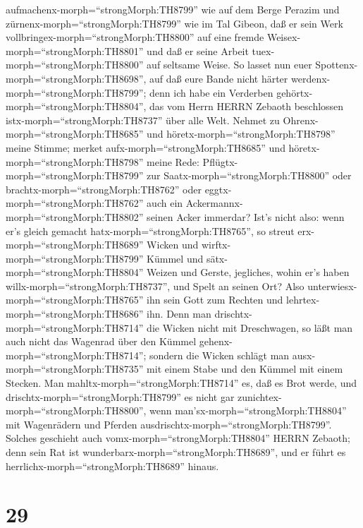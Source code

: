 aufmachenx-morph=``strongMorph:TH8799'' wie auf dem Berge Perazim und
zürnenx-morph=``strongMorph:TH8799'' wie im Tal Gibeon, daß er sein Werk
vollbringex-morph=``strongMorph:TH8800'' auf eine fremde
Weisex-morph=``strongMorph:TH8801'' und daß er seine Arbeit
tuex-morph=``strongMorph:TH8800'' auf seltsame Weise.  So
lasset nun euer Spottenx-morph=``strongMorph:TH8698'', auf daß eure
Bande nicht härter werdenx-morph=``strongMorph:TH8799''; denn ich habe
ein Verderben gehörtx-morph=``strongMorph:TH8804'', das vom Herrn HERRN
Zebaoth beschlossen istx-morph=``strongMorph:TH8737'' über alle Welt.
 Nehmet zu Ohrenx-morph=``strongMorph:TH8685'' und
höretx-morph=``strongMorph:TH8798'' meine Stimme; merket
aufx-morph=``strongMorph:TH8685'' und
höretx-morph=``strongMorph:TH8798'' meine Rede: 
Pflügtx-morph=``strongMorph:TH8799'' zur
Saatx-morph=``strongMorph:TH8800'' oder
brachtx-morph=``strongMorph:TH8762'' oder
eggtx-morph=``strongMorph:TH8762'' auch ein
Ackermannx-morph=``strongMorph:TH8802'' seinen Acker immerdar?
 Ist's nicht also: wenn er's gleich gemacht
hatx-morph=``strongMorph:TH8765'', so streut
erx-morph=``strongMorph:TH8689'' Wicken und
wirftx-morph=``strongMorph:TH8799'' Kümmel und
sätx-morph=``strongMorph:TH8804'' Weizen und Gerste, jegliches, wohin
er's haben willx-morph=``strongMorph:TH8737'', und Spelt an seinen Ort?
 Also unterwiesx-morph=``strongMorph:TH8765'' ihn sein Gott
zum Rechten und lehrtex-morph=``strongMorph:TH8686'' ihn. 
Denn man drischtx-morph=``strongMorph:TH8714'' die Wicken nicht mit
Dreschwagen, so läßt man auch nicht das Wagenrad über den Kümmel
gehenx-morph=``strongMorph:TH8714''; sondern die Wicken schlägt man
ausx-morph=``strongMorph:TH8735'' mit einem Stabe und den Kümmel mit
einem Stecken.  Man mahltx-morph=``strongMorph:TH8714'' es,
daß es Brot werde, und drischtx-morph=``strongMorph:TH8799'' es nicht
gar zunichtex-morph=``strongMorph:TH8800'', wenn
man'sx-morph=``strongMorph:TH8804'' mit Wagenrädern und Pferden
ausdrischtx-morph=``strongMorph:TH8799''.  Solches
geschieht auch vomx-morph=``strongMorph:TH8804'' HERRN Zebaoth; denn
sein Rat ist wunderbarx-morph=``strongMorph:TH8689'', und er führt es
herrlichx-morph=``strongMorph:TH8689'' hinaus.

\hypertarget{section-28}{%
\section{29}\label{section-28}}

